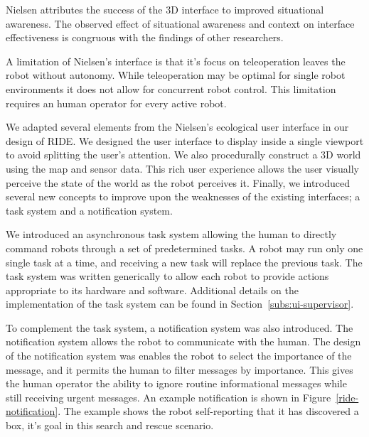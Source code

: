 Nielsen attributes the success of the 3D interface to improved situational awareness. The observed effect of situational awareness and context on interface effectiveness is congruous with the findings of other researchers. \cite{Nielsen_Teleoperation}

A limitation of Nielsen's interface is that it's focus on teleoperation leaves the robot without autonomy. While teleoperation may be optimal for single robot environments it does not allow for concurrent robot control. This limitation requires an human operator for every active robot.

We adapted several elements from the Nielsen's ecological user interface in our design of RIDE. We designed the user interface to display inside a single viewport to avoid splitting the user's attention. We also procedurally construct a 3D world using the map and sensor data. This rich user experience allows the user visually perceive the state of the world as the robot perceives it. Finally, we introduced several new concepts to improve upon the weaknesses of the existing interfaces; a task system and a notification system.

We introduced an asynchronous task system allowing the human to directly command robots through a set of predetermined tasks. A robot may run only one single task at a time, and receiving a new task will replace the previous task. The task system was written generically to allow each robot to provide actions appropriate to its hardware and software. Additional details on the implementation of the task system can be found in Section~\ref{subs:ui-supervisor}.

To complement the task system, a notification system was also introduced. The notification system allows the robot to communicate with the human. The design of the notification system was enables the robot to select the importance of the message, and it permits the human to filter messages by importance. This gives the human operator the ability to ignore routine informational messages while still receiving urgent messages. An example notification is shown in Figure~\ref{ride-notification}. The example shows the robot self-reporting that it has discovered a box, it's goal in this search and rescue scenario.

